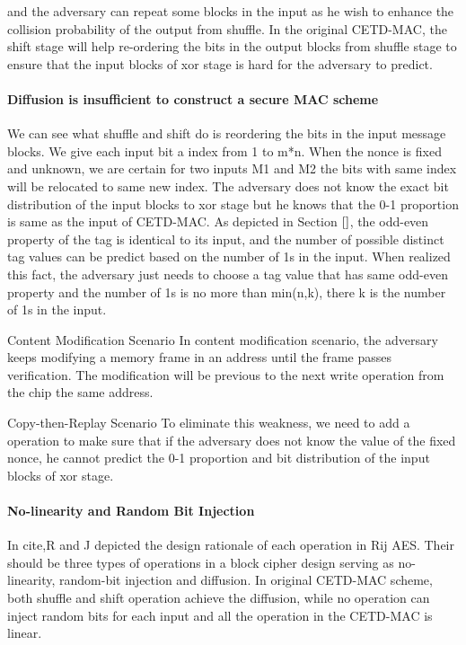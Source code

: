 and the adversary can repeat some blocks in the input as he wish to enhance the collision probability of the output from shuffle.  In the original CETD-MAC, the shift stage will help re-ordering the bits in the output blocks from shuffle stage to ensure that the input blocks of xor stage is hard for the adversary to predict. 

\paragraph{Diffusion is insufficient to construct a secure MAC scheme}
We can see what shuffle and shift do is reordering the bits in the input message
blocks. We give each input bit a index from 1 to m*n. When the nonce is fixed
and unknown, we are certain for two inputs M1 and M2 the bits with same index
will be relocated to same new index. The adversary does not know the exact bit
distribution of the input blocks to xor stage but he knows that the 0-1
proportion is same as the input of CETD-MAC. As depicted in Section $\ref{}$, the odd-even property of the tag is identical to its input, and the number of possible distinct tag values can be predict based on the number of 1s in the input. When realized this fact, the adversary just needs to choose a tag value that has same odd-even property and the number of 1s is no more than min(n,k), there k is the number of 1s in the input.

Content Modification Scenario
In content modification scenario, the adversary keeps modifying a memory frame in an address until the frame passes verification. The modification will be previous to the next write operation from the chip the same address. 

Copy-then-Replay Scenario
To eliminate this weakness, we need to add a operation to make sure that if the adversary does not know the value of the fixed nonce, he cannot predict the 0-1 proportion and bit distribution of the input blocks of xor stage. 
%
\paragraph{No-linearity and Random Bit Injection}
In cite{},R and J depicted the design rationale of each operation in Rij AES. Their should be three types of operations in a block cipher design serving as no-linearity, random-bit injection and diffusion.  
In original CETD-MAC scheme, both shuffle and shift operation achieve the diffusion, while no operation can inject random bits for each input and all the operation in the CETD-MAC is linear.  

